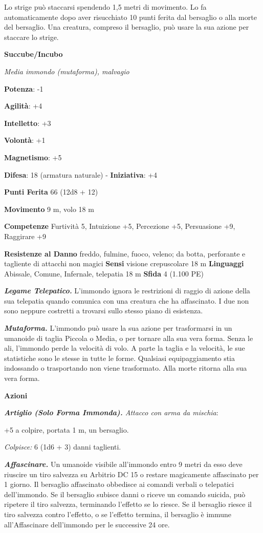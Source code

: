 \begin{multicols}{2}
Lo strige può staccarsi spendendo 1,5 metri di movimento. Lo fa
automaticamente dopo aver risucchiato 10 punti ferita dal bersaglio o
alla morte del bersaglio. Una creatura, compreso il bersaglio, può usare
la sua azione per staccare lo strige.

\textbf{Succube/Incubo}

\emph{Media immondo (mutaforma), malvagio}

\textbf{Potenza}: -1

\textbf{Agilità}: +4

\textbf{Intelletto}: +3

\textbf{Volontà}: +1

\textbf{Magnetismo}: +5

\textbf{Difesa}: 18 (armatura naturale) - \textbf{Iniziativa}: +4

\textbf{Punti Ferita} 66 (12d8 + 12)

\textbf{Movimento} 9 m, volo 18 m

\textbf{Competenze} Furtività 5, Intuizione +5, Percezione +5, Persuasione
+9, Raggirare +9

\textbf{Resistenze al Danno} freddo, fulmine, fuoco, veleno;
da botta, perforante e tagliente di attacchi non magici
\textbf{Sensi} visione crepuscolare 18 m
\textbf{Linguaggi} Abissale, Comune, Infernale, telepatia 18 m
\textbf{Sfida} 4 (1.100 PE)\smallskip

\emph{\textbf{Legame Telepatico.}} L'immondo ignora le restrizioni di
raggio di azione della sua telepatia quando comunica con una creatura
che ha affascinato. I due non sono neppure costretti a trovarsi sullo
stesso piano di esistenza.

\emph{\textbf{Mutaforma.}} L'immondo può usare la sua azione per
trasformarsi in un umanoide di taglia Piccola o Media, o per tornare
alla sua vera forma. Senza le ali, l'immondo perde la velocità di volo.
A parte la taglia e la velocità, le sue statistiche sono le stesse in
tutte le forme. Qualsiasi equipaggiamento stia indossando o trasportando
non viene trasformato. Alla morte ritorna alla sua vera forma.

\smallskip\textbf{Azioni}

\emph{\textbf{Artiglio (Solo Forma Immonda).} Attacco con arma da
mischia}:

+5 a colpire, portata 1 m, un bersaglio.

\emph{Colpisce:} 6 (1d6 + 3) danni taglienti.

\emph{\textbf{Affascinare.}} Un umanoide visibile all'immondo entro 9
metri da esso deve riuscire un tiro salvezza su Arbitrio DC 15 o restare
magicamente affascinato per 1 giorno. Il bersaglio affascinato obbedisce
ai comandi verbali o telepatici dell'immondo. Se il bersaglio subisce
danni o riceve un comando suicida, può ripetere il tiro salvezza,
terminando l'effetto se lo riesce. Se il bersaglio riesce il tiro
salvezza contro l'effetto, o se l'effetto termina, il bersaglio è immune
all'Affascinare dell'immondo per le successive 24 ore.


\end{multicols}
